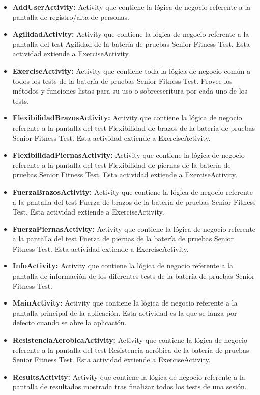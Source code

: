 \begin{itemize}
\item \textbf{AddUserActivity:} Activity que contiene la lógica de negocio referente a la pantalla de registro/alta de personas. 
\item \textbf{AgilidadActivity:} Activity que contiene la lógica de negocio referente a la pantalla del test Agilidad de la batería de pruebas Senior Fitness Test. Esta actividad extiende a ExerciseActivity.
\item \textbf{ExerciseActivity:} Activity que contiene toda la lógica de negocio común a todos los tests de la batería de pruebas Senior Fitness Test. Provee los métodos y funciones listas para su uso o sobreescritura por cada uno de los tests.
\item \textbf{FlexibilidadBrazosActivity:} Activity que contiene la lógica de negocio referente a la pantalla del test Flexibilidad de brazos de la batería de pruebas Senior Fitness Test. Esta actividad extiende a ExerciseActivity.
\item \textbf{FlexibilidadPiernasActivity:} Activity que contiene la lógica de negocio referente a la pantalla del test Flexibilidad de piernas de la batería de pruebas Senior Fitness Test. Esta actividad extiende a ExerciseActivity.
\item \textbf{FuerzaBrazosActivity:} Activity que contiene la lógica de negocio referente a la pantalla del test Fuerza de brazos de la batería de pruebas Senior Fitness Test. Esta actividad extiende a ExerciseActivity.
\item \textbf{FuerzaPiernasActivity:} Activity que contiene la lógica de negocio referente a la pantalla del test Fuerza de piernas de la batería de pruebas Senior Fitness Test. Esta actividad extiende a ExerciseActivity.
\item \textbf{InfoActivity:} Activity que contiene la lógica de negocio referente a la pantalla de información de los diferentes tests de la batería de pruebas Senior Fitness Test.
\item \textbf{MainActivity:} Activity que contiene la lógica de negocio referente a la pantalla principal de la aplicación. Esta actividad es la que se lanza por defecto cuando se abre la aplicación.
\item \textbf{ResistenciaAerobicaActivity:} Activity que contiene la lógica de negocio referente a la pantalla del test Resistencia aeróbica de la batería de pruebas Senior Fitness Test. Esta actividad extiende a ExerciseActivity.
\item \textbf{ResultsActivity:} Activity que contiene la lógica de negocio referente a la pantalla de resultados mostrada tras finalizar todos los tests de una sesión.

\end{itemize}
